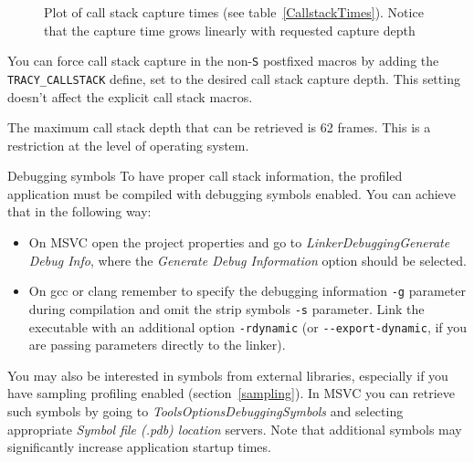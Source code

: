 \documentclass[hidelinks,titlepage,a4paper]{article}
\begin{document}
\begin{figure}[h]
\centering{}
\caption{Plot of call stack capture times (see table~\ref{CallstackTimes}). Notice that the capture time grows linearly with requested capture depth}
\label{CallstackPlot}
\end{figure}

You can force call stack capture in the non-\texttt{S} postfixed macros by adding the \texttt{TRACY\_CALLSTACK} define, set to the desired call stack capture depth. This setting doesn't affect the explicit call stack macros.

The maximum call stack depth that can be retrieved is 62 frames. This is a restriction at the level of operating system.

\begin{bclogo}[
noborder=true,
couleur=black!5,
logo=\bcattention
]{Debugging symbols}
To have proper call stack information, the profiled application must be compiled with debugging symbols enabled. You can achieve that in the following way:

\begin{itemize}
\item On MSVC open the project properties and go to \emph{Linker\textrightarrow Debugging\textrightarrow Generate Debug Info}, where the \emph{Generate Debug Information} option should be selected.
\item On gcc or clang remember to specify the debugging information \texttt{-g} parameter during compilation and omit the strip symbols \texttt{-s} parameter. Link the executable with an additional option \texttt{-rdynamic} (or \texttt{-{}-export-dynamic}, if you are passing parameters directly to the linker).
\end{itemize}

You may also be interested in symbols from external libraries, especially if you have sampling profiling enabled (section~\ref{sampling}). In MSVC you can retrieve such symbols by going to \emph{Tools\textrightarrow Options\textrightarrow Debugging\textrightarrow Symbols} and selecting appropriate \emph{Symbol file (.pdb) location} servers. Note that additional symbols may significantly increase application startup times.
\end{bclogo}
\end{document}
